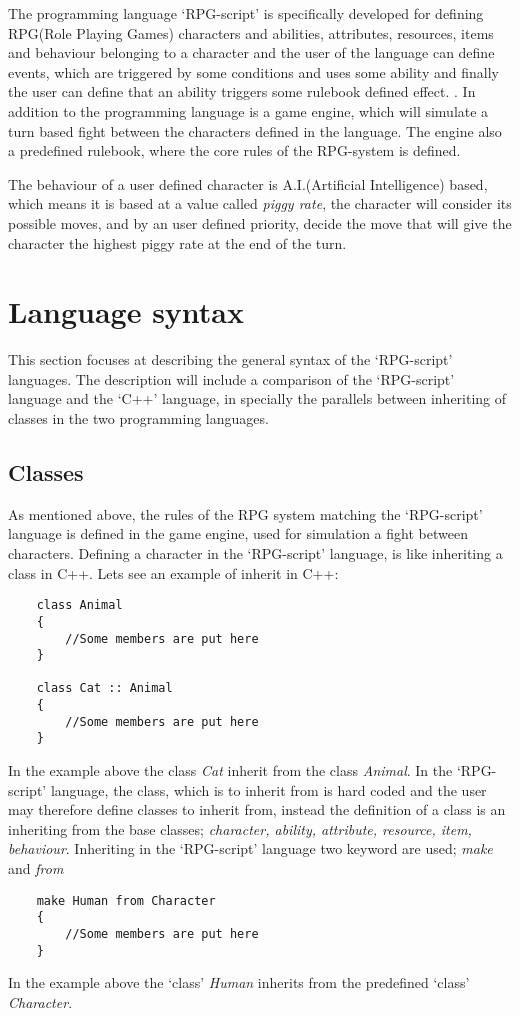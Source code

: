 The programming language `RPG-script' is specifically developed for defining RPG(Role Playing Games) characters and abilities, attributes, resources, items and behaviour belonging to a character and the user of the language can define events, which are triggered by some conditions and uses some ability and finally the user can define that an ability triggers some rulebook defined effect. . 
In addition to the programming language is a game engine, which will simulate a turn based fight between the characters defined in the language. The engine also a predefined rulebook, where the core rules of the RPG-system is defined. 

The behaviour of a user defined character is A.I.(Artificial Intelligence) based, which means it is based at a value called \emph{piggy rate}, the character will consider its possible moves, and by an user defined priority, decide the move that will give the character the highest piggy rate at the end of the turn.

\section{Language syntax}
This section focuses at describing the general syntax of the `RPG-script' languages. The description will include a comparison of the `RPG-script' language and the `C++' language, in specially the parallels between inheriting of classes in the two programming languages. 

\subsection{Classes}
As mentioned above, the rules of the RPG system matching the `RPG-script' language is defined in the game engine, used for simulation a fight between characters.
Defining a character in the `RPG-script' language, is like inheriting a class in C++.
Lets see an example of inherit in C++:
\begin{lstlisting}
	class Animal
	{
		//Some members are put here
	}
	
	class Cat :: Animal
	{
		//Some members are put here
	}
\end{lstlisting}
In the example above the class \emph{Cat} inherit from the class \emph{Animal}. In the `RPG-script' language, the class, which is to inherit from is hard coded and the user may therefore define classes to inherit from, instead the definition of a class is an inheriting from the base classes; \emph{character, ability, attribute, resource, item, behaviour}.
Inheriting in the `RPG-script' language two keyword are used; \emph{make} and \emph{from}
\begin{lstlisting}
	make Human from Character
	{
		//Some members are put here
	}
\end{lstlisting}
In the example above the `class' \emph{Human} inherits from the predefined `class' \emph{Character}.
